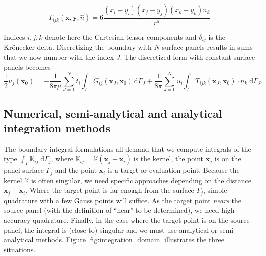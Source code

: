 \documentclass[final,3p,times]{elsarticle}
\newcommand{\K}{\mathbb{K}}
\newcommand{\di}[1]{\text{d}#1}
\newcommand{\nhat}{\hat{n}}
\newcommand{\vect}[1]{\mathbf{#1}}
\begin{document}
\begin{equation}
	\label{eqn:stresslet}
	T_{ijk}(\vect{x},\vect{y},\nhat)  =  6\frac{(x_i-y_i)(x_j-y_j)(x_k-y_k)n_k}{r^{5}} \end{equation}

Indices $i, j, k$ denote here the Cartesian-tensor components and $\delta_{ij}$ is the Kr{\"o}necker delta. Discretizing the boundary with $N$ surface panels results in sums that we now number with the index $J$.
The discretized form with constant surface panels becomes
%
\begin{equation}
	\label{eqn:stokes_bem_discretized}
	\frac{1}{2}u_j(\vect{x_0}) = -\frac{1}{8\pi\mu}\sum_{J=1}^{N}t_i\int_{\Gamma} G_{ij}(\vect{x}_J, \vect{x}_0)\;\di{\Gamma_J} + \frac{1}{8\pi} \sum_{J=0}^{N}u_i\int_{\Gamma} T_{ijk}(\vect{x}_J, \vect{x}_0)\cdot n_k\;\di{\Gamma_J}.
\end{equation}


\subsection{Numerical, semi-analytical and analytical integration methods}

The boundary integral formulations all demand that we compute integrals of the type $\int_{\Gamma} \K_{ij}\;\di{\Gamma_j}$, where $\K_{ij}=\K(\vect{x}_j-\vect{x}_i)$ is the kernel, the point $\vect{x}_j$ is on the panel surface $\Gamma_j$ and the point $\vect{x}_i$ is a target or evaluation point. Because the kernel $\K$ is often singular, we need specific approaches depending on the distance $\vect{x}_j-\vect{x}_i$. Where the target point is far enough from the surface $\Gamma_j$, simple quadrature with a few Gauss points will suffice. As the target point \emph{nears} the source panel (with the definition of ``near'' to be determined), we need high-accuracy quadrature. Finally, in the case where the target point is on the source panel, the integral is (close to) singular and we must use analytical or semi-analytical methods. Figure \ref{fig:integration_domain} illustrates the three situations.
\end{document}
